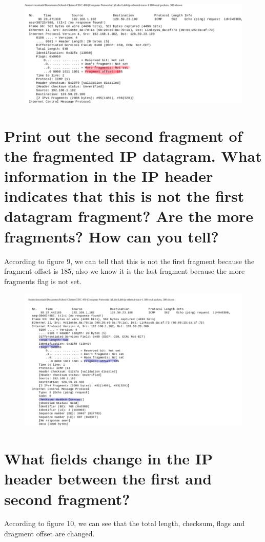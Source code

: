 \documentclass{article}
\begin{document}
\begin{figure}[h!]
\centering
\includegraphics[scale=0.5]{Q12.pdf}
\caption{}
\end{figure}

\section*{Print out the second fragment of the fragmented IP datagram. What information in
the IP header indicates that this is not the first datagram fragment? Are the more
fragments? How can you tell?}
According to figure 9, we can tell that this is not the first fragment because the fragment offset is 185, also we know it is the last fragment because the more fragments flag is not set.\\

\begin{figure}[h!]
\centering
\includegraphics[scale=0.5]{Q13.pdf}
\caption{}
\end{figure}

\section*{What fields change in the IP header between the first and second fragment?}
According to figure 10, we can see that the total length, checksum, flags and dragment offset are changed.
\end{document}
